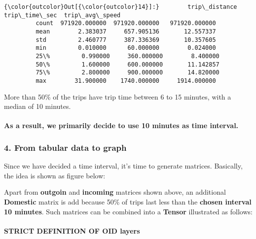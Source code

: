 \documentclass[11pt]{article}
\begin{document}
\begin{Verbatim}[commandchars=\\\{\}]
{\color{outcolor}Out[{\color{outcolor}14}]:}        trip\_distance  trip\_time\_sec  trip\_avg\_speed
         count  971920.000000  971920.000000   971920.000000
         mean        2.383037     657.905136       12.557337
         std         2.460777     387.336369       10.357605
         min         0.010000      60.000000        0.024000
         25\%         0.990000     360.000000        8.400000
         50\%         1.600000     600.000000       11.142857
         75\%         2.800000     900.000000       14.820000
         max        31.900000    1740.000000     1914.000000
\end{Verbatim}
            
    More than 50\% of the trips have trip time between 6 to 15 minutes, with
a median of 10 minutes.

\paragraph{As a result, we primarily decide to use 10 minutes as time
interval.}\label{as-a-result-we-primarily-decide-to-use-10-minutes-as-time-interval.}

    \subsubsection{4. From tabular data to
graph}\label{from-tabular-data-to-graph}

Since we have decided a time interval, it's time to generate matrices.
Basically, the idea is shown as figure below:

    Apart from \textbf{outgoin} and \textbf{incoming} matrices shown above,
an additional \textbf{Domestic} matrix is add because 50\% of trips last
less than the \textbf{chosen interval 10 minutes}. Such matrices can be
combined into a \textbf{Tensor} illustrated as follows:

    \paragraph{STRICT DEFINITION OF OID
layers}\label{strict-definition-of-oid-layers}
\end{document}

